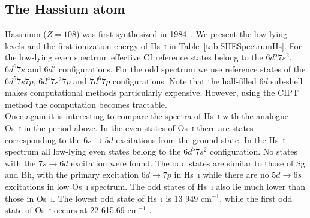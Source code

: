 \documentclass[10pt,a4paper, twoside, openright]{report}
\begin{document}
\subsection{The Hassium atom} \label{sec:Hs}

Hassnium ($Z=108$) was first synthesized in 1984~\cite{Munzenberg1984}. We present the low-lying levels and the first ionization energy of Hs~\textsc{i} in Table~\ref{tab:SHESpectrumHs}. For the low-lying even spectrum effective CI reference states belong to the $6d^5 7s^2$, $6d^6 7s$ and $6d^7$ configurations. For the odd spectrum we use reference states of the $6d^5 7s 7p$, $6d^4 7s^2 7p$ and $7d^6 7p$ configurations.  Note that the half-filled $6d$ sub-shell makes computational methods particularly expensive. However, using the CIPT method the computation becomes tractable.  \\
\linebreak
Once again it is interesting to compare the spectra of Hs~\textsc{i} with the analogue Os~\textsc{i} in the period above. In the even states of Os~\textsc{i} there are states corresponding to the $6s \rightarrow 5d$ excitations from the ground state. In the Hs~\textsc{i} spectrum all low-lying even states belong to the  $6d^5 7s^2$ configuration. No states with the $7s \rightarrow 6d$ excitation were found. The odd states are similar to those of Sg and Bh, with the primary excitation $6d \rightarrow 7p$ in Hs~\textsc{i} while there are no  $5d \rightarrow 6s$ excitations in low Os~\textsc{i} spectrum. The odd states of Hs~\textsc{i} also lie much lower than those in Os~\textsc{i}.  The lowest odd state of Hs~\textsc{i} is 13 949 cm$^{-1}$, while the first odd state of Os~\textsc{i} occurs at 22 615.69 cm$^{-1}$ \cite{NIST_ASD}. 
\end{document}
